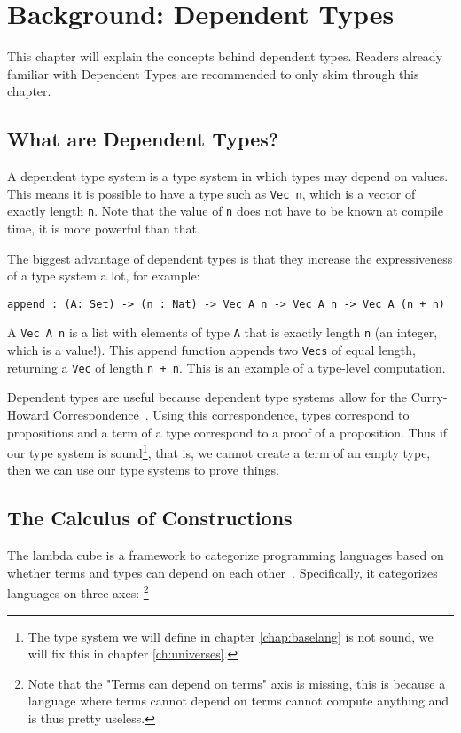 \chapter{\label{chap:bg-dp}Background: Dependent Types}

This chapter will explain the concepts behind dependent types. Readers already familiar with Dependent Types are recommended to only skim through this chapter.

\section{What are Dependent Types?}

A dependent type system is a type system in which types may depend on values. This means it is possible to have a type such as \verb|Vec n|, which is a vector of exactly length \verb|n|. Note that the value of \verb|n| does not have to be known at compile time, it is more powerful than that. 

The biggest advantage of dependent types is that they increase the expressiveness of a type system a lot, for example:
\begin{lstlisting}
append : (A: Set) -> (n : Nat) -> Vec A n -> Vec A n -> Vec A (n + n)
\end{lstlisting}
A \verb|Vec A n| is a list with elements of type \verb|A| that is exactly length \verb|n| (an integer, which is a value!). This append function appends two \verb|Vecs| of equal length, returning a \verb|Vec| of length \verb|n + n|. This is an example of a type-level computation.

Dependent types are useful because dependent type systems allow for the Curry-Howard Correspondence~\cite{chc}. Using this correspondence, types correspond to propositions and a term of a type correspond to a proof of a proposition. Thus if our type system is sound\footnote{The type system we will define in chapter \ref{chap:baselang} is not sound, we will fix this in chapter \ref{ch:universes}.}, that is, we cannot create a term of an empty type, then we can use our type systems to prove things.

\section{The Calculus of Constructions}

The lambda cube is a framework to categorize programming languages based on whether terms and types can depend on each other~\cite{lambda_cube}. Specifically, it categorizes languages on three axes: \footnote{Note that the "Terms can depend on terms" axis is missing, this is because a language where terms cannot depend on terms cannot compute anything and is thus pretty useless.}

